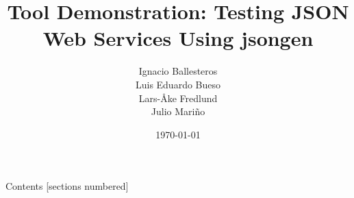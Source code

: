 \documentclass[10pt]{beamer}
\title{Tool Demonstration: Testing JSON Web Services Using jsongen}
\date{\today}
\author{
  Ignacio Ballesteros\\
  Luis Eduardo Bueso\\
  Lars-Åke Fredlund\\
  Julio Mariño
}
\institute{Universidad Politécnica de Madrid - PROLE 2018}
\begin{document}
\maketitle

\begin{frame}{Contents}
  [sections numbered]
  \tableofcontents[hideallsubsections]
\end{frame}










\end{document}
